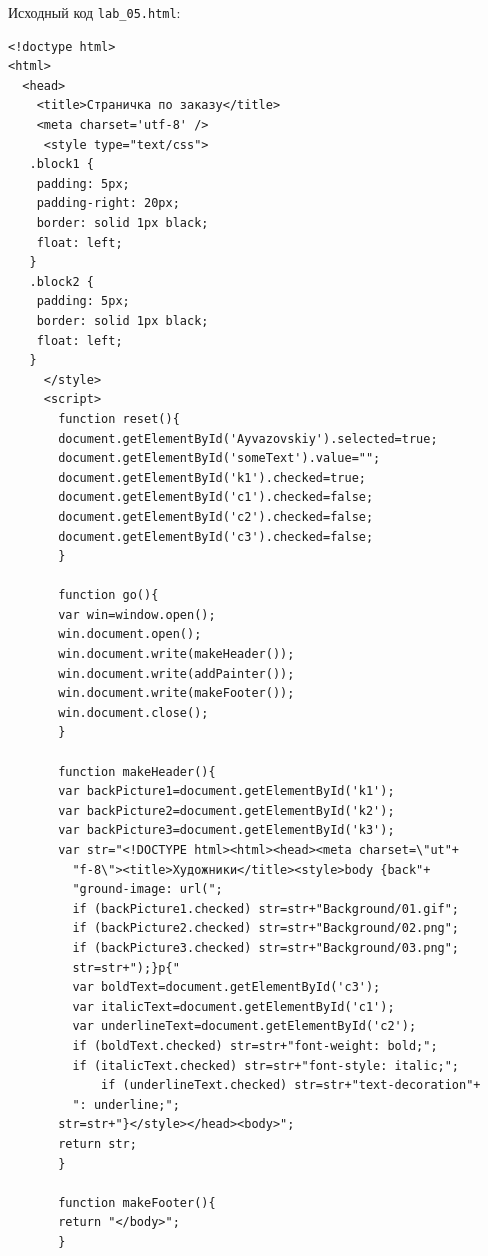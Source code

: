 Исходный код \verb|lab_05.html|:

\begin{verbatim}
<!doctype html>
<html>
  <head>
    <title>Страничка по заказу</title>
    <meta charset='utf-8' />
     <style type="text/css">
   .block1 { 
    padding: 5px;
    padding-right: 20px; 
    border: solid 1px black; 
    float: left;
   }
   .block2 { 
    padding: 5px; 
    border: solid 1px black; 
    float: left; 
   }
     </style>
     <script>
       function reset(){
	   document.getElementById('Ayvazovskiy').selected=true;
	   document.getElementById('someText').value="";
	   document.getElementById('k1').checked=true;
	   document.getElementById('c1').checked=false;
	   document.getElementById('c2').checked=false;
	   document.getElementById('c3').checked=false;
       }

       function go(){
	   var win=window.open();
	   win.document.open();
	   win.document.write(makeHeader());
	   win.document.write(addPainter());
	   win.document.write(makeFooter());
	   win.document.close();
       }

       function makeHeader(){
	   var backPicture1=document.getElementById('k1');
	   var backPicture2=document.getElementById('k2');
	   var backPicture3=document.getElementById('k3');
	   var str="<!DOCTYPE html><html><head><meta charset=\"ut"+
	   	 "f-8\"><title>Художники</title><style>body {back"+
		 "ground-image: url(";
	     if (backPicture1.checked) str=str+"Background/01.gif";
	     if (backPicture2.checked) str=str+"Background/02.png";
	     if (backPicture3.checked) str=str+"Background/03.png";
	     str=str+");}p{"
	     var boldText=document.getElementById('c3');
	     var italicText=document.getElementById('c1');
	     var underlineText=document.getElementById('c2');
	     if (boldText.checked) str=str+"font-weight: bold;";
	     if (italicText.checked) str=str+"font-style: italic;";
	     	 if (underlineText.checked) str=str+"text-decoration"+
		 ": underline;";
	   str=str+"}</style></head><body>";
	   return str;
       }

       function makeFooter(){
	   return "</body>";
       }


\end{verbatim}
